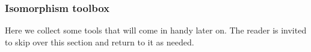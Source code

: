 \subsubsection{Isomorphism toolbox}\label{isomorphism-toolbox}
Here we collect some tools that will come in handy later on. The reader is invited to skip over this section and return to it as needed.
\ccpad
\begin{code}%
\>[0]\AgdaSpace{}%
\AgdaModule{\AgdaUnderscore{}}\AgdaSpace{}%
\AgdaSymbol{\{}\AgdaSpace{}%
\AgdaSpace{}%
\AgdaSymbol{:}\AgdaSpace{}%
\AgdaSymbol{\}\{}\AgdaSpace{}%
\AgdaSymbol{:}\AgdaSpace{}%
\AgdaSpace{}%
\AgdaSpace{}%
\AgdaSymbol{\}\{}\AgdaSpace{}%
\AgdaSymbol{:}\AgdaSpace{}%
\AgdaSpace{}%
\AgdaSpace{}%
\AgdaSymbol{\}}\AgdaSpace{}%
\<%
\\
%
\\[\AgdaEmptyExtraSkip]%
\>[0][@{}l@{\AgdaIndent{0}}]%
\>[1]\AgdaSpace{}%
\AgdaSymbol{:}\AgdaSpace{}%
\AgdaSymbol{(}\AgdaSpace{}%
\AgdaSymbol{:}\AgdaSpace{}%
\AgdaSpace{}%
\AgdaSpace{}%
\AgdaSymbol{)}\AgdaSpace{}%
\AgdaSpace{}%
\AgdaSpace{}%
\AgdaSpace{}%
\<%
\\
%
\>[1]\AgdaSpace{}%
\AgdaSpace{}%
\AgdaSymbol{=}\AgdaSpace{}%
\AgdaSpace{}%
\AgdaSpace{}%
\<%
\\
%
\\[\AgdaEmptyExtraSkip]%
%
\>[1]\AgdaSpace{}%
\AgdaSymbol{:}\AgdaSpace{}%
\AgdaSymbol{(}\AgdaSpace{}%
\AgdaSymbol{:}\AgdaSpace{}%
\AgdaSpace{}%
\AgdaSpace{}%
\AgdaSymbol{)}\AgdaSpace{}%
\AgdaSpace{}%
\AgdaSpace{}%
\AgdaSpace{}%
\<%
\\
%
\>[1]\AgdaSpace{}%
\AgdaSpace{}%
\AgdaSymbol{=}\AgdaSpace{}%
\AgdaSpace{}%
\AgdaSpace{}%
\AgdaSpace{}%
\<%
\\
%
\\[\AgdaEmptyExtraSkip]%
%
\>[1]\AgdaSpace{}%

\end{code}

